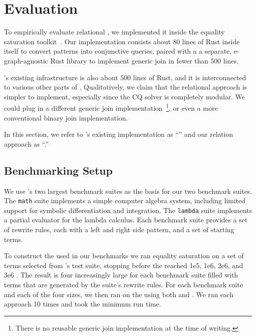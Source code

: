 \section{Evaluation}
\label{sec:eval}
\label{sec:evaluation}

To empirically evaluate relational \ematching,
 we implemented it inside the
 \egg equality saturation toolkit~\cite{egg}.
Our implementation consists
 about 80 lines of Rust inside \egg itself to convert
 patterns into conjunctive queries,
 paired with a
 a separate, e-graph-agnostic
 Rust library to implement generic join in fewer than $500$ lines.

\egg's existing
 \ematching infrastructure is also about $500$ lines of Rust,
 and it is interconnected to various other parts of \egg.
Qualitatively,
 we claim that the relational approach is simpler to implement,
 especially since the CQ solver is completely modular.
 We could plug in a different generic join implementation~\footnote{
   There is no reusable generic join implementation at the time of writing.},
 or even a more conventional binary join implementation.

In this section, we refer to \egg's existing \ematching implementation as ``\EM''
 and our relation approach as ``\GJ.''

\subsection{Benchmarking Setup}

We use \egg's two largest benchmark suites
 as the basis for our two benchmark suites.
The \texttt{math} suite implements a
 simple computer algebra system,
 including limited support for symbolic differentiation and integration.
The \texttt{lambda} suite implements a
 partial evaluator for the lambda calculus.
Each \egg benchmark suite provides a set of rewrite rules,
 each with a left and right side pattern,
 and a set of starting terms.

To construct the \egraphs used in our benchmarks
 we ran equality saturation
 on a set of terms selected from \egg's test suite,
 stopping before the \egraph reached
 1e5, 1e6, 2e6, and 3e6 \enodes.
The result is four increasingly large \egraphs
 for each benchmark suite
 filled with terms that are
 generated by the suite's rewrite rules.
For each benchmark suite
 and each of the four \egraph sizes,
 we then ran \ematching on the \egraph
 using both \EM and \GJ.
We ran each approach 10 times and
 took the minimum run time.

